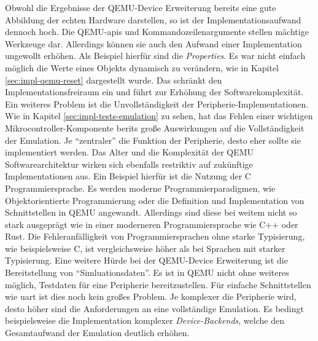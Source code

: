 Obwohl die Ergebnisse der QEMU-Device Erweiterung bereits eine gute Abbildung
der echten Hardware darstellen, so ist der Implementationsaufwand dennoch hoch.
Die QEMU-\acp{api} und Kommandozeilenargumente stellen mächtige Werkzeuge dar.
Allerdings können sie auch den Aufwand einer Implementation ungewollt erhöhen.
Als Beispiel hierfür sind die \textit{Properties}.
Es war nicht einfach möglich die Werte eines Objekts dynamisch zu verändern,
wie in Kapitel \ref{sec:impl-qemu-reset} dargestellt wurde.
Das schränkt den Implementationsfreiraum ein und führt zur Erhöhung der
Softwarekomplexität.
Ein weiteres Problem ist die Unvollständigkeit der Peripherie-Implementationen.
Wie in Kapitel \ref{sec:impl-tests-emulation} zu sehen, hat das Fehlen einer
wichtigen Mikrocontroller-Komponente berits große Auswirkungen auf die
Vollständigkeit der Emulation.
Je \enquote{zentraler} die Funktion der Peripherie, desto eher sollte sie
implementiert werden.
Das Alter und die Komplexität der QEMU Softwarearchitektur wirken sich
ebenfalls restriktiv auf zukünftige Implementationen aus.
Ein Beispiel hierfür ist die Nutzung der C Programmiersprache.
Es werden moderne Programmierparadigmen, wie Objektorientierte Programmierung
oder die Definition und Implementation von Schnittstellen in QEMU angewandt.
Allerdings sind diese bei weitem nicht so stark ausgeprägt wie in einer
moderneren Programmiersprache wie C++ oder Rust.
Die Fehleranfälligkeit von Programmiersprachen ohne starke Typisierung, wie
beispielsweise C, ist vergleichsweise höher als bei Sprachen mit starker
Typisierung\cite{GithubProgrammingLanguagesStudy}.
Eine weitere Hürde bei der QEMU-Device Erweiterung ist die Bereitstellung von
\enquote{Simluationsdaten}.
Es ist in QEMU nicht ohne weiteres möglich, Testdaten für eine Peripherie
bereitzustellen.
Für einfache Schnittstellen wie \ac{uart} ist dies noch kein großes Problem.
Je komplexer die Peripherie wird, desto höher sind die Anforderungen an eine
vollständige Emulation.
Es bedingt beispielsweise die Implementation komplexer
\textit{Device-Backends}, welche den Gesamtaufwand der Emulation deutlich
erhöhen.

